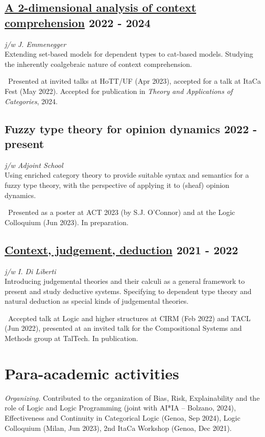 \documentclass[a4paper,9pt]{article}
\begin{document}
\subsection*{\href{https://arxiv.org/abs/2403.03085}{A 2-dimensional analysis of context comprehension} \hfill 2022 - 2024}
\textit{j/w J. Emmenegger}\\
Extending set-based models for dependent types to cat-based models. Studying the inherently coalgebraic nature of context comprehension.

\, Presented at invited talks at HoTT/UF (Apr 2023), accepted for a talk at ItaCa Fest (May 2022). Accepted for publication in \emph{Theory and Applications of Categories}, 2024.

\subsection*{Fuzzy type theory for opinion dynamics \hfill 2022 - present}
\textit{j/w Adjoint School}\\
Using enriched category theory to provide suitable syntax and semantics for a fuzzy type theory, with the perspective of applying it to (sheaf) opinion dynamics.

\, Presented as a poster at ACT 2023 (by S.J. O'Connor) and at the Logic Colloquium (Jun 2023). In preparation.

\subsection*{\href{https://arxiv.org/abs/2111.09438}{Context, judgement, deduction} \hfill 2021 - 2022}
\textit{j/w I. Di Liberti}\\
Introducing judgemental theories and their calculi as a general framework to present and study deductive systems. Specifying to dependent type theory and natural deduction as special kinds of judgemental theories.

\, Accepted talk at Logic and higher structures at CIRM (Feb 2022) and TACL (Jun 2022), presented at an invited talk for the Compositional Systems and Methods group at TalTech. In publication.

\section*{ Para-academic activities}
\textit{Organizing.} Contributed to the organization of Bias, Risk, Explainability and the role of Logic and Logic Programming (joint with AI*IA -- Bolzano, 2024), Effectiveness and Continuity in Categorical Logic (Genoa, Sep 2024), Logic Colloquium (Milan, Jun 2023), 2nd ItaCa Workshop (Genoa, Dec 2021).
\end{document}
